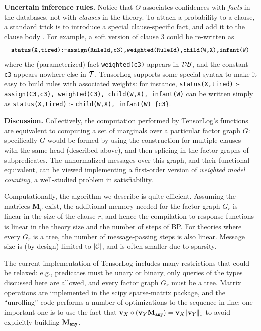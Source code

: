 \documentclass{article}
\newcommand{\cd}[1]{{\small \texttt{#1}}}
\newcommand{\mysubsection}[1]{\textbf{{#1}.}}
\newif\iflong
\newcommand{\longonly}[1]{\iflong{#1}\fi}
\newcommand{\trm}[1]{\textit{#1}}
\newcommand{\vek}[1]{\textbf{#1}}
\newcommand{\M}{\textbf{M}}
\newcommand{\C}{{\cal{C}}}
\newcommand{\T}{{\cal{T}}}
\newcommand{\DB}{{\cal{DB}}}
\newcommand{\onenorm}[1]{{|\!|{#1}|\!|_1}}
\begin{document}
\mysubsection{Uncertain inference rules} \label{sec:soft-rules} Notice
that $\Theta$ associates confidences with \emph{facts} in the
databases, not with \emph{clauses} in the theory.  To attach a
probability to a clause, a standard trick is to introduce a special
clause-specific fact, and add it to the clause body
\citet{poole1997independent}.  For example, a soft version of clause 3
could be re-written as
\[
\cd{status(X,tired):-assign(RuleId,c3),weighted(RuleId),child(W,X),infant(W)}
\]
where the (parameterized) fact \cd{weighted(c3)} appears in $\DB$, and
the constant \cd{c3} appears nowhere else in $\T$.  TensorLog supports
some special syntax to make it easy to build rules with associated
weights: for instance, \cd{status(X,tired)} :- \cd{assign(C3,c3),
  weighted(C3), child(W,X), infant(W)} can be written simply as
\cd{status(X,tired)} :- \cd{child(W,X), infant(W) \{c3\}}.  \longonly{
  One can also attach a computed set of features to a rule in order to
  weight it, as in ProPPR: e.g., one can write \cd{status(X,tired)} :-
  \cd{\{all(A):child(W,X),age(W,A)\}}, which indicates that the all
  the ages of the children of $X$ should be used as features to
  determine if the rule succeeds, and it will be expanded to
  \cd{status(X,tired)} :- \cd{child(W,X),age(W,A),weighted(A)}.  These
  features are used in the experiments below, where we compare to
  ProPPR.}

\mysubsection{Discussion}
Collectively, the computation performed by TensorLog's functions are
equivalent to computing a set of marginals over a particular factor
graph $G$: specifically $G$ would be formed by using the construction
for multiple clauses with the same head (described above), and then
splicing in the factor graphs of subpredicates.  The unnormalized
messages over this graph, and their functional equivalent, can be
viewed implementing a first-order version of \trm{weighted model
  counting}, a well-studied problem in satisfiability.

Computationally, the algorithm we describe is quite
efficient. Assuming the matrices $\M_p$ exist, the additional memory
needed for the factor-graph $G_r$ is linear in the size of the clause
$r$, and hence the compilation to response functions is linear in the
theory size and the number of steps of BP.  For theories where every
$G_r$ is a tree, the number of message-passing steps is also linear.
Message size is (by design) limited to $|\C|$, and is often smaller
due to sparsity.

The current implementation of TensorLog includes many restrictions
that could be relaxed: e.g., predicates must be unary or binary, only
queries of the types discussed here are allowed, and every factor
graph $G_r$ must be a tree. 
Matrix operations are implemented in the
scipy sparse-matrix package, and the ``unrolling'' code performs a
number of optimizations to the sequence in-line: one important one is
to use the fact that \( \vek{v}_X \circ (\vek{v}_Y \M_\cd{any}) =
\vek{v}_X \onenorm{\vek{v}_Y} \) to avoid explicitly building
$\M_\cd{any}$.  
\end{document}

